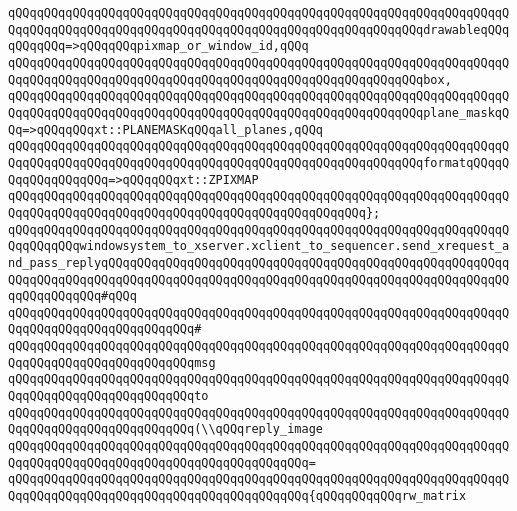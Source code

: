 \verb|qQQqqQQqqQQqqQQqqQQqqQQqqQQqqQQqqQQqqQQqqQQqqQQqqQQqqQQqqQQqqQQqqQQqqQQqqQQqqQQqqQQqqQQqqQQqqQQqqQQqqQQqqQQqqQQqqQQqqQQqqQQqqQQqdrawableqQQqqQQqqQQq=>qQQqqQQqpixmap_or_window_id,qQQq|\newline
\verb|qQQqqQQqqQQqqQQqqQQqqQQqqQQqqQQqqQQqqQQqqQQqqQQqqQQqqQQqqQQqqQQqqQQqqQQqqQQqqQQqqQQqqQQqqQQqqQQqqQQqqQQqqQQqqQQqqQQqqQQqqQQqqQQqbox,|\newline
\verb|qQQqqQQqqQQqqQQqqQQqqQQqqQQqqQQqqQQqqQQqqQQqqQQqqQQqqQQqqQQqqQQqqQQqqQQqqQQqqQQqqQQqqQQqqQQqqQQqqQQqqQQqqQQqqQQqqQQqqQQqqQQqqQQqplane_maskqQQq=>qQQqqQQqxt::PLANEMASKqQQqall_planes,qQQq|\newline
\verb|qQQqqQQqqQQqqQQqqQQqqQQqqQQqqQQqqQQqqQQqqQQqqQQqqQQqqQQqqQQqqQQqqQQqqQQqqQQqqQQqqQQqqQQqqQQqqQQqqQQqqQQqqQQqqQQqqQQqqQQqqQQqqQQqformatqQQqqQQqqQQqqQQqqQQq=>qQQqqQQqxt::ZPIXMAP|\newline
\verb|qQQqqQQqqQQqqQQqqQQqqQQqqQQqqQQqqQQqqQQqqQQqqQQqqQQqqQQqqQQqqQQqqQQqqQQqqQQqqQQqqQQqqQQqqQQqqQQqqQQqqQQqqQQqqQQqqQQqqQQq};|\newline
\newline
\verb|qQQqqQQqqQQqqQQqqQQqqQQqqQQqqQQqqQQqqQQqqQQqqQQqqQQqqQQqqQQqqQQqqQQqqQQqqQQqqQQqwindowsystem_to_xserver.xclient_to_sequencer.send_xrequest_and_pass_replyqQQqqQQqqQQqqQQqqQQqqQQqqQQqqQQqqQQqqQQqqQQqqQQqqQQqqQQqqQQqqQQqqQQqqQQqqQQqqQQqqQQqqQQqqQQqqQQqqQQqqQQqqQQqqQQqqQQqqQQqqQQqqQQqqQQqqQQqqQQq#qQQq|\newline
\verb|qQQqqQQqqQQqqQQqqQQqqQQqqQQqqQQqqQQqqQQqqQQqqQQqqQQqqQQqqQQqqQQqqQQqqQQqqQQqqQQqqQQqqQQqqQQqqQQq#|\newline
\verb|qQQqqQQqqQQqqQQqqQQqqQQqqQQqqQQqqQQqqQQqqQQqqQQqqQQqqQQqqQQqqQQqqQQqqQQqqQQqqQQqqQQqqQQqqQQqqQQqmsg|\newline
\verb|qQQqqQQqqQQqqQQqqQQqqQQqqQQqqQQqqQQqqQQqqQQqqQQqqQQqqQQqqQQqqQQqqQQqqQQqqQQqqQQqqQQqqQQqqQQqqQQqto|\newline
\verb|qQQqqQQqqQQqqQQqqQQqqQQqqQQqqQQqqQQqqQQqqQQqqQQqqQQqqQQqqQQqqQQqqQQqqQQqqQQqqQQqqQQqqQQqqQQqqQQq(\\qQQqreply_image|\newline
\verb|qQQqqQQqqQQqqQQqqQQqqQQqqQQqqQQqqQQqqQQqqQQqqQQqqQQqqQQqqQQqqQQqqQQqqQQqqQQqqQQqqQQqqQQqqQQqqQQqqQQqqQQqqQQqqQQq=|\newline
\verb|qQQqqQQqqQQqqQQqqQQqqQQqqQQqqQQqqQQqqQQqqQQqqQQqqQQqqQQqqQQqqQQqqQQqqQQqqQQqqQQqqQQqqQQqqQQqqQQqqQQqqQQqqQQqqQQq{qQQqqQQqqQQqrw_matrix|\newline
